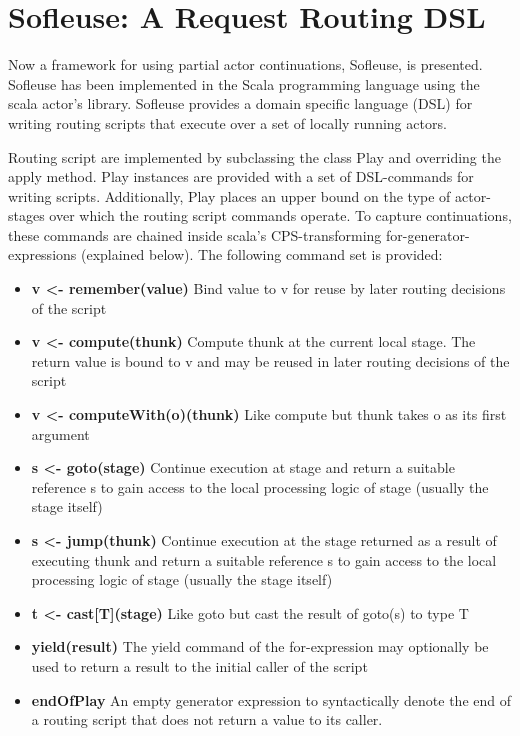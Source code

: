 \documentclass{sig-alternate}
\begin{document}
                         



\section{Sofleuse: A Request Routing DSL}

Now a framework for using partial actor continuations, Sofleuse, is presented. Sofleuse has been
implemented in the Scala programming language using the scala actor's library. Sofleuse provides a
domain specific language (DSL) for writing routing scripts that execute over a set of locally
running actors.

Routing script are implemented by subclassing the class Play and overriding the apply method. Play
instances are provided with a set of DSL-commands for writing scripts. Additionally, Play places an
upper bound on the type of actor-stages over which the routing script commands operate. To capture
continuations, these commands are chained inside scala's CPS-transforming for-generator-expressions
(explained below). The following command set is provided:

\begin{itemize}                                   
	\item \textbf{v <- remember(value)} Bind value to v for reuse by later routing decisions of the
	script
	\item \textbf{v <- compute(thunk)} Compute thunk at the current local stage.  The return value is bound
	to v and may be reused in later routing decisions of the script
	\item \textbf{v <- computeWith(o)(thunk)} Like compute but thunk takes o as its first argument
	\item \textbf{s <- goto(stage)} Continue execution at stage and return a suitable reference s to gain 
	access to the local processing logic of stage (usually the stage itself)
	\item \textbf{s <- jump(thunk)} Continue execution at the stage returned as a result of executing thunk 
	and return a suitable reference s to gain access to the local processing logic of stage (usually 
	the stage itself)
	\item \textbf{t <- cast[T](stage)} Like goto but cast the result of goto(s) to type T   
	\item \textbf{yield(result)} The yield command of the for-expression may optionally be used to return 
	a result to the initial caller of the script                           	
	\item \textbf{endOfPlay} An empty generator expression to syntactically denote 
	the end of a routing script that does not return a value to its caller.
\end{itemize}                                                                                                  
\end{document}
